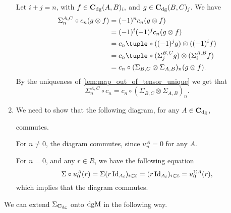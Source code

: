 \begin{remark}
\begin{enumerate}
{            Let \( i + j = n \), with \( f \in \operatorname{\mathbf{C}}_{\operatorname{dg}}(A, B)_i, \) and \( g \in \operatorname{\mathbf{C}}_{\operatorname{dg}}(B, C)_j \). We have
            \begin{align*}
                \Sigma_n^{A, C} \circ c_n (g \otimes f) &= (-1)^n c_n (g \otimes f) \\
                &= (-1)^i (-1)^j c_n (g \otimes f) \\
                &= c_n\tuple*{((-1)^j g) \otimes ((-1)^i f)} \\
                &= c_n\tuple*{(\Sigma_j^{B, C} g) \otimes (\Sigma_i^{A, B} f)} \\
                &= c_n \circ (\Sigma_{B, C} \otimes \Sigma_{A, B})_n (g \otimes f).
            \end{align*}
            By the uniqueness of \autoref{lem:map_out_of_tensor_unique} we get that
            \[
                \Sigma_n^{A, C} \circ c_n = c_n \circ (\Sigma_{B, C} \otimes \Sigma_{A, B})_n.
            \]
        }
        \item {
            We need to show that the following diagram, for any \( A \in \operatorname{\mathbf{C}}_{\operatorname{dg}} \),
            \begin{center}
            \end{center}
            commutes.

            For \( n \neq 0 \), the diagram commutes, since \( u_n^A = 0 \) for any \( A \).

            For \( n = 0 \), and any \( r \in R \), we have the following equation
            \[
                \Sigma \circ u_0^A (r) = \Sigma (r \operatorname{Id}_{A_i})_{i \in {\mathbb{Z}}} = (r \operatorname{Id}_{A_i})_{i \in {\mathbb{Z}}} = u_0^{\Sigma A} (r),
            \]
            which implies that the diagram commutes.
        }
    \end{enumerate}
\end{remark}

We can extend \( \Sigma_{\operatorname{\mathbf{C}}_{\operatorname{dg}}} \) onto \( \operatorname{dgM} \) in the following way.

